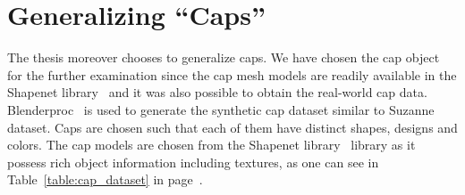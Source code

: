 \section{Generalizing ``Caps''}

The thesis moreover chooses to generalize caps. We have chosen the cap object for the further examination since the cap mesh models are readily available in the Shapenet library~\cite{chang2015shapenet}
and it was also possible to obtain the real-world cap data. Blenderproc~\cite{blenderproc} is used to generate the synthetic cap dataset similar to Suzanne dataset.
Caps are chosen such that each of them have distinct shapes, designs and colors. The cap models are chosen from the Shapenet library~\cite{chang2015shapenet} library
as it possess rich object information including textures, as one can see in Table~\ref{table:cap_dataset} in page~\pageref{table:cap_dataset}.\\

